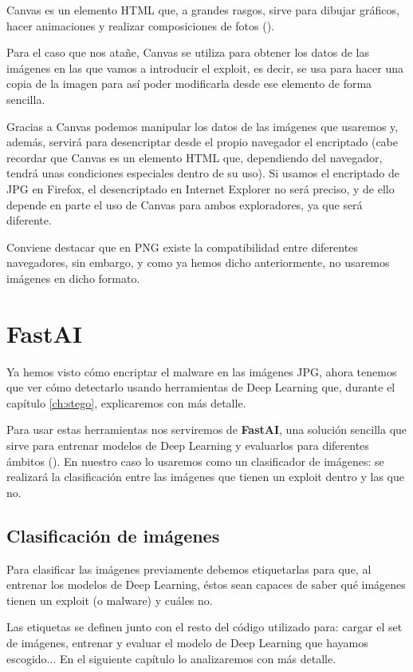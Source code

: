 Canvas es un elemento HTML que, a grandes rasgos, sirve para dibujar gráficos, hacer animaciones y realizar composiciones de fotos (\cite{canvas}).

Para el caso que nos atañe, Canvas se utiliza para obtener los datos de las imágenes en las que vamos a introducir el exploit, es decir, se usa para hacer una copia de la imagen para así poder modificarla desde ese elemento de forma sencilla.

Gracias a Canvas podemos manipular los datos de las imágenes que usaremos y, además, servirá para desencriptar desde el propio navegador el encriptado (cabe recordar que Canvas es un elemento HTML que, dependiendo del navegador, tendrá unas condiciones especiales dentro de su uso). Si usamos el encriptado de JPG en Firefox, el desencriptado en Internet Explorer no será preciso, y de ello depende en parte el uso de Canvas para ambos exploradores, ya que será diferente.

Conviene destacar que en PNG existe la compatibilidad entre diferentes navegadores, sin embargo, y como ya hemos dicho anteriormente, no usaremos imágenes en dicho formato.

\section{FastAI}

Ya hemos visto cómo encriptar el malware en las imágenes JPG, ahora tenemos que ver cómo detectarlo usando herramientas de Deep Learning que, durante el capítulo \ref{ch:stego}, explicaremos con más detalle.

Para usar estas herramientas nos serviremos de \textbf{FastAI}, una solución sencilla que sirve para entrenar modelos de Deep Learning y evaluarlos para diferentes ámbitos (\cite{fastai}). En nuestro caso lo usaremos como un clasificador de imágenes: se realizará la clasificación entre las imágenes que tienen un exploit dentro y las que no. %

\subsection{Clasificación de imágenes}

Para clasificar las imágenes previamente debemos etiquetarlas para que, al entrenar los modelos de Deep Learning, éstos sean capaces de saber qué imágenes tienen un exploit (o malware) y cuáles no.

Las etiquetas se definen junto con el resto del código utilizado para: cargar el set de imágenes, entrenar y evaluar el modelo de Deep Learning que hayamos escogido... En el siguiente capítulo lo analizaremos con más detalle.

